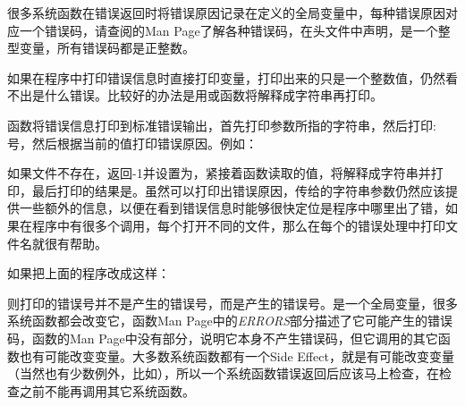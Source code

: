 很多系统函数在错误返回时将错误原因记录在定义的全局变量中，每种错误原因对应一个错误码，请查阅的Man Page了解各种错误码，在头文件中声明，是一个整型变量，所有错误码都是正整数。



如果在程序中打印错误信息时直接打印变量，打印出来的只是一个整数值，仍然看不出是什么错误。比较好的办法是用或函数将解释成字符串再打印。




函数将错误信息打印到标准错误输出，首先打印参数所指的字符串，然后打印:号，然后根据当前的值打印错误原因。例如：





如果文件不存在，返回-1并设置为，紧接着函数读取的值，将解释成字符串并打印，最后打印的结果是。虽然可以打印出错误原因，传给的字符串参数仍然应该提供一些额外的信息，以便在看到错误信息时能够很快定位是程序中哪里出了错，如果在程序中有很多个调用，每个打开不同的文件，那么在每个的错误处理中打印文件名就很有帮助。



如果把上面的程序改成这样：




则打印的错误号并不是产生的错误号，而是产生的错误号。是一个全局变量，很多系统函数都会改变它，函数Man Page中的\emph{ERRORS}部分描述了它可能产生的错误码，函数的Man Page中没有部分，说明它本身不产生错误码，但它调用的其它函数也有可能改变变量。大多数系统函数都有一个Side Effect，就是有可能改变变量（当然也有少数例外，比如），所以一个系统函数错误返回后应该马上检查，在检查之前不能再调用其它系统函数。



